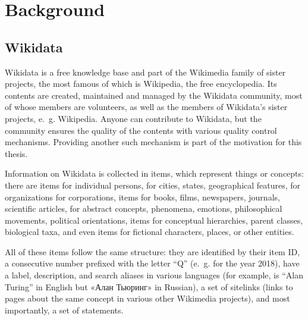 
\chapter{Background}
\label{ch:Background}


\section{Wikidata}
\label{ch:Background:Wikidata}

Wikidata is a free knowledge base
and part of the Wikimedia family of sister projects,
the most famous of which is Wikipedia, the free encyclopedia.
Its contents are created, maintained and managed by the Wikidata community,
most of whose members are volunteers,
as well as the members of Wikidata’s sister projects, e.~g. Wikipedia.
Anyone can contribute to Wikidata,
but the community ensures the quality of the contents with various quality control mechanisms.
Providing another such mechanism is part of the motivation for this thesis. %

Information on Wikidata is collected in items,
which represent things or concepts:
there are items for individual persons,
for cities, states, geographical features,
for organizations for corporations,
items for books, films, newspapers, journals, scientific articles,
for abstract concepts, phenomena, emotions, philosophical movements, political orientations,
items for conceptual hierarchies, parent classes, biological taxa,
and even items for fictional characters, places, or other entities.

All of these items follow the same structure:
they are identified by their item ID,
a consecutive number prefixed with the letter “Q”
(e.~g.  for the year 2018),
have a label, description, and search aliases in various languages
(for example,  is “Alan Turing” in English but «\foreignlanguage{russian}{Алан Тьюринг}» in Russian),
a set of sitelinks (links to pages about the same concept in various other Wikimedia projects),
and most importantly, a set of statements.

